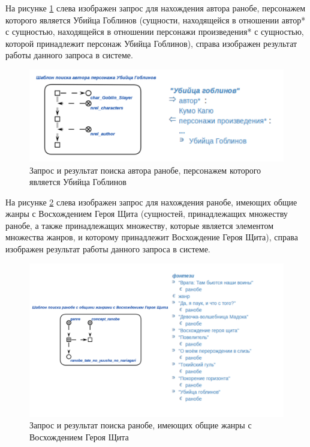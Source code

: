 На рисунке \ref{fig:search_kumo_kagyu} слева изображен запрос для нахождения автора ранобе, персонажем которого является Убийца Гоблинов (сущности, находящейся в отношении автор* с сущностью, находящейся в отношении персонажи произведения* с сущностью, которой принадлежит персонаж Убийца Гоблинов), справа изображен результат работы данного запроса в системе.

\begin{figure}[H]
    \centering
    \includegraphics[scale=0.13]{imgs/gs_author_qr.png}
    \caption{Запрос и результат поиска автора ранобе, персонажем которого является Убийца Гоблинов}
    \label{fig:search_kumo_kagyu}
\end{figure}

На рисунке \ref{fig:search_same_genres} слева изображен запрос для нахождения ранобе, имеющих общие жанры с Восхождением Героя Щита (сущностей, принадлежащих множеству ранобе, а также принадлежащих множеству, которые является элементом множества жанров, и которому принадлежит Восхождение Героя Щита), справа изображен результат работы данного запроса в системе.

\begin{figure}[H]
    \centering
    \includegraphics[scale=0.14]{imgs/same_genres.png}
    \caption{Запрос и результат поиска ранобе, имеющих общие жанры с Восхождением Героя Щита}
    \label{fig:search_same_genres}
\end{figure}

